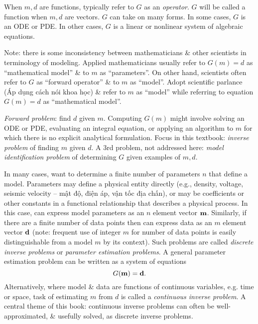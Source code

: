 \documentclass{article}
\begin{document}
\begin{itemize}
\begin{itemize}
		When $m,d$ are functions, typically refer to $G$ as an {\it operator}. $G$ will be called a function when $m,d$ are vectors. $G$ can take on many forms. In some cases, $G$ is an ODE or PDE. In other cases, $G$ is a linear or nonlinear system of algebraic equations.
		
		Note: there is some inconsistency between mathematicians \& other scientists in terminology of modeling. Applied mathematicians usually refer to $G(m) = d$ as ``mathematical model'' \& to $m$ as ``parameters''. On other hand, scientists often refer to $G$ as ``forward operator'' \& to $m$ as ``model''. Adopt scientific parlance (Áp dụng cách nói khoa học) \& refer to $m$ as ``model'' while referring to equation $G(m) = d$ as ``mathematical model''.
		
		{\it Forward problem}: find $d$ given $m$. Computing $G(m)$ might involve solving an ODE or PDE, evaluating an integral equation, or applying an algorithm to $m$ for which there is no explicit analytical formulation. Focus in this textbook: {\it inverse problem} of finding $m$ given $d$. A 3rd problem, not addressed here: {\it model identification problem} of determining $G$ given examples of $m,d$.
		
		In many cases, want to determine a finite number of parameters $n$ that define a model. Parameters may define a physical entity directly (e.g., density, voltage, seismic velocity -- mật độ, điện áp, vận tốc địa chấn), or may be coefficients or other constants in a functional relationship that describes a physical process. In this case, can express model parameters as an $n$ element vector ${\bf m}$. Similarly, if there are a finite number of data points then can express data as an $m$ element vector ${\bf d}$ (note: frequent use of integer $m$ for number of data points is easily distinguishable from a model $m$ by its context). Such problems are called {\it discrete inverse problems} or {\it parameter estimation problems}. A general parameter estimation problem can be written as a system of equations
		\begin{equation*}
			G({\bf m}) = {\bf d}.
		\end{equation*}
		Alternatively, where model \& data are functions of continuous variables, e.g. time or space, task of estimating $m$ from $d$ is called a {\it continuous inverse problem}. A central theme of this book: continuous inverse problems can often be well-approximated, \& usefully solved, as discrete inverse problems.
		

\end{itemize}
\end{itemize}
\end{document}
